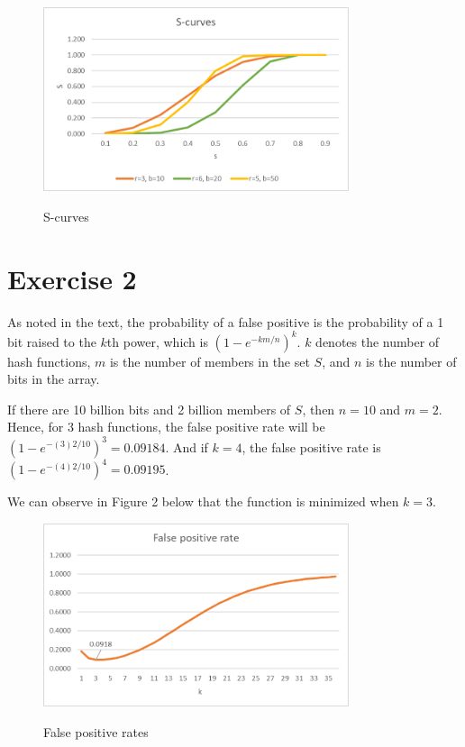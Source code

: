 \documentclass[12t]{article}
\begin{document}
	\begin{figure}[h]
	\includegraphics[width=0.8\textwidth]{./Figures/s-curves.png}\\	
	\caption{S-curves}
	\end{figure}

	\newpage
	
	\section*{Exercise 2}

	As noted in the text, the probability of a false positive is the probability of a 1 bit raised to the $k$th power, which is $(1-e^{-km/n})^k$. $k$ denotes the number of hash functions, $m$ is the number of  members in the set $S$, and $n$ is the number of bits in the array. 
	
	If there are 10 billion bits and 2 billion members of $S$, then $n=10$ and $m=2$. Hence, for 3 hash functions, the false positive rate will be $(1-e^{-(3)2/10})^3=0.09184$. And if $k=4$, the false positive rate is $(1-e^{-(4)2/10})^4=0.09195$. 
	
	We can observe in Figure 2 below that the function is minimized when $k=3$. 
	
	\begin{figure}[h]
	\includegraphics[width=0.8\textwidth]{./Figures/false_positive.png}\\	
	\caption{False positive rates}
	\end{figure}
\end{document}
